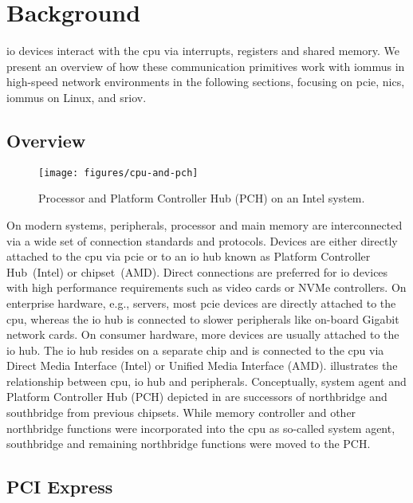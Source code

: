 \chapter{Background}
\label{chap:background}

\Ac{io} devices interact with the \acs{cpu} via interrupts, registers and shared
memory. We present an overview of how these communication primitives work with
\acp{iommu} in high-speed network environments in the following sections,
focusing on \acs{pcie}, \acsp{nic}, \acsp{iommu} on Linux, and \acs{sriov}.


\section{Overview}
\label{sec:overview}

\begin{figure}[!b]
    \centering
    \texttt{[image: figures/cpu-and-pch]}
    \caption{Processor and Platform Controller Hub (PCH) on an Intel system.}
    \label{fig:pch}
\end{figure}

On modern systems, peripherals, processor and main memory are interconnected via
a wide set of connection standards and protocols. Devices are either directly
attached to the \ac{cpu} via \ac{pcie} or to an \acs{io} hub known as Platform
Controller Hub~(Intel) or chipset~(AMD). Direct connections are preferred for
\ac{io} devices with high performance requirements such as video cards or NVMe
controllers. On enterprise hardware, e.g., servers, most \ac{pcie} devices are
directly attached to the \ac{cpu}, whereas the \ac{io} hub is connected to
slower peripherals like on-board Gigabit network cards. On consumer hardware,
more devices are usually attached to the \ac{io} hub. The \ac{io} hub resides on
a separate chip and is connected to the \ac{cpu} via Direct Media Interface
(Intel) or Unified Media Interface (AMD).  illustrates the
relationship between \ac{cpu}, \ac{io} hub and peripherals. Conceptually, system
agent and Platform Controller Hub (PCH) depicted in  are
successors of northbridge and southbridge from previous chipsets. While memory
controller and other northbridge functions were incorporated into the \ac{cpu}
as so-called system agent, southbridge and remaining northbridge functions were
moved to the PCH.


\section{PCI Express}
\label{sec:pcie}

